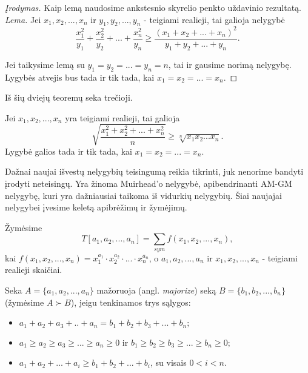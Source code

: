 \begin{proof}[Įrodymas]
  Kaip lemą naudosime ankstesnio skyrelio penkto uždavinio rezultatą. \\
  \textit{Lema.} Jei $x_{1},x_{2},...,x_{n}$ ir $y_{1},y_{2},...,y_{n}$ -
  teigiami realieji, tai galioja nelygybė
  $$\frac{x_{1}^2}{y_{1}}+\frac{x_{2}^2}{y_{2}}+...+\frac{x_{n}^2}{y_{n}}
  \geq \frac{(x_{1}+x_{2}+...+x_{n})^2}{y_{1}+y_{2}+...+y_{n}}.$$

  Jei taikysime lemą su $y_{1}=y_{2}=...=y_{n}=n$, tai ir gausime norimą
  nelygybę. Lygybės atvejis bus tada ir tik tada, kai
  $x_{1}=x_{2}=...=x_{n}$.
\end{proof}

Iš šių dviejų teoremų seka trečioji.

\begin{thm}[SM-GM nelygybė]
  Jei $x_{1},x_{2},...,x_{n}$ yra teigiami realieji, tai galioja
  $$\sqrt{\frac{x_{1}^2+x_{2}^2+...+x_{n}^2}{n}}\geq
  \sqrt[n]{x_{1}x_{2}...x_{n}}.$$ Lygybė galios tada ir tik tada, kai
  $x_{1}=x_{2}=...=x_{n}$.
\end{thm}

Dažnai naujai išvestų nelygybių teisingumą reikia tikrinti, juk nenorime
bandyti įrodyti neteisingų. Yra žinoma Muirhead'o nelygybė,
apibendrinanti AM-GM nelygybę, kuri yra dažniausiai taikoma iš vidurkių
nelygybių. Šiai naujajai nelygybei įvesime keletą apibrėžimų ir žymėjimų.

\begin{api} Žymėsime $$T[a_1,a_2,...,a_n]=\sum_{sym}{f(x_1,x_2,...,x_n)},$$
  kai $f(x_1,x_2,...,x_n)=x_1^{a_1}\cdot x_2^{a_2}\cdot...\cdot x_n^{a_n}$, o
  $a_1,a_2,...,a_n$ ir $x_1,x_2,...,x_n$ - teigiami realieji
  skaičiai.
\end{api}

\begin{api} Seka $A=\{a_1,a_2,...,a_n\}$ mažoruoja (angl. \textit{majorize})
  seką $B=\{b_1,b_2,...,b_n\}$ (žymėsime $A \succ B$), jeigu tenkinamos trys
  sąlygos:
  \begin{itemize}
    \item $a_1+a_2+a_3+..+a_n=b_1+b_2+b_3+...+b_n;$
    \item $a_1\geq a_2\geq a_3 \geq ... \geq a_n\geq 0$ ir $b_1\geq b_2\geq
      b_3\geq...\geq b_n\geq0;$
    \item $a_1+a_2+...+a_i\geq b_1+b_2+...+b_i$, su visais $0<i<n$.
  \end{itemize}
\end{api}

